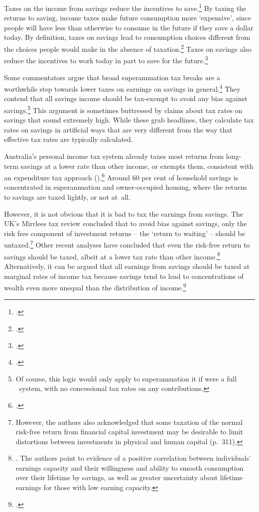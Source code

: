 Taxes on the income from savings reduce the incentives to save.\footcites[][32]{HenryTaxReview2010}[][58]{Treasury2015BudgetPapers201516}[][295]{MirrleesAdamBesleyEtAl2011}  By taxing the returns to saving, income taxes make future consumption more ‘expensive’, since people will have less than otherwise to consume in the future if they save a dollar today. By definition, taxes on savings lead to consumption choices different from the choices people would make in the absence of taxation.\footcite[][295]{MirrleesAdamBesleyEtAl2011} Taxes on savings also reduce the incentives to work today in part to save for the future.\footcite[][12]{HenryTaxReview2010}  


Some commentators argue that broad superannuation tax breaks are a worthwhile step towards lower taxes on earnings on savings in general.\footcite{CarlingCowanErgas2015}  They contend that all savings income should be tax-exempt to avoid any bias against savings.\footnote{Of course, this logic would only apply to superannuation it if were a full \TEE\ system, with no concessional tax rates on any contributions.} This argument is sometimes buttressed by claims about tax rates on savings that sound extremely high. While these grab headlines, they calculate tax rates on savings in artificial ways that are very different from the way that effective tax rates are typically calculated.  

Australia’s personal income tax system already taxes most returns from long-term savings at a lower rate than other income, or exempts them, consistent with an expenditure tax approach ().\footcite[][12]{HenryTaxReview2010}  Around 60 per cent of household savings is concentrated in superannuation and owner-occupied housing, where the returns to savings are taxed lightly, or not at~all. 

However, it is not obvious that it is bad to tax the earnings from savings. The UK’s Mirrlees tax review concluded that to avoid bias against savings, only the risk free component of investment returns – the ‘return to waiting’ – should be untaxed.\footnote{\textcite[][284]{MirrleesAdamBesleyEtAl2011} However, the authors also acknowledged that some taxation of the normal risk-free return from financial capital investment may be desirable to limit distortions between investments in physical and human capital (p.~311).} 
Other recent analyses have concluded that even the risk-free return to savings should be taxed, albeit at a lower tax rate than other income.\footnote{\textcite{BanksDiamond2010}. The authors point to evidence of a positive correlation between individuals’ earnings capacity and their willingness and ability to smooth consumption over their lifetime by savings, as well as greater uncertainty about lifetime earnings for those with low earning capacity.}  Alternatively, it can be argued that all earnings from savings should be taxed at marginal rates of income tax because savings tend to lead to concentrations of wealth even more unequal than the distribution of income.\footcites{Leigh2013}{Piketty2013}[][23]{Ingles2015}

